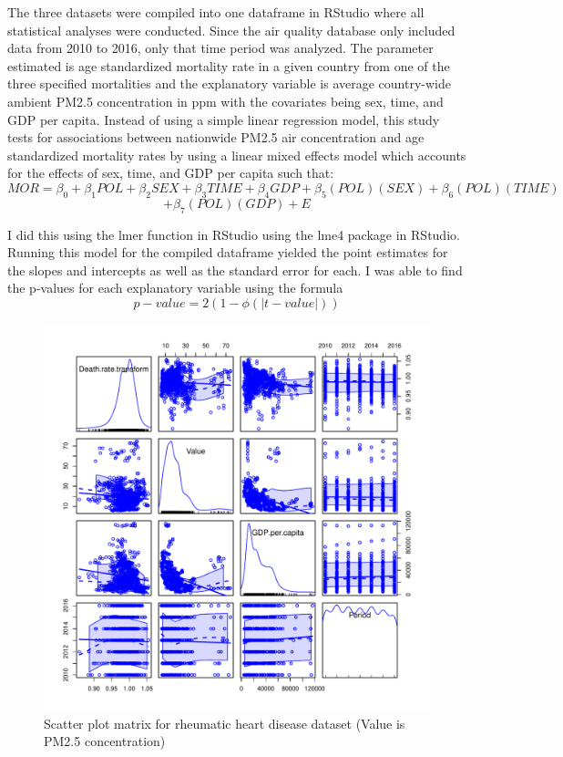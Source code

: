 \documentclass[12pt, letterpaper, twoside]{article}
\begin{document}
The three datasets were compiled into one dataframe in RStudio where all
statistical analyses were conducted. Since the air quality database only included
data from 2010 to 2016, only that time period was analyzed. The parameter estimated
is age standardized mortality rate in a given country from one of the three
specified mortalities and the explanatory variable is average country-wide
ambient PM2.5 concentration in ppm with the covariates being sex, time, and GDP
per capita. Instead of using a simple linear regression model, this study tests
for associations between nationwide PM2.5 air concentration and age standardized
mortality rates by using a linear mixed effects model which accounts for the
effects of sex, time, and GDP per capita such that:
\[
  MOR = \beta_{0} + \beta_{1}POL + \beta_{2}SEX + \beta_{3}TIME +\beta_{4}GDP
  + \beta_{5}(POL)(SEX) + \beta_{6}(POL)(TIME)
\]
\[
 + \beta_{7}(POL)(GDP) + E
\]

I did this using the lmer function in RStudio using the lme4 package in RStudio.
Running this model for the compiled dataframe yielded the point estimates for
the slopes and intercepts as well as the standard error for each. I was able to
find the p-values for each explanatory variable using the formula
\[
  p-value = 2(1 - \phi(|t-value|))
\]

\begin{figure}[t]
\includegraphics[scale=0.5]{scatterplotmatrix.rheum.pdf}
\centering
\caption{Scatter plot matrix for rheumatic heart disease dataset (Value is PM2.5 concentration)}
\label{fig:Figure 3}
    \vspace{1cm}
\end{figure}
\end{document}
